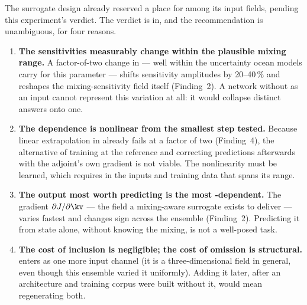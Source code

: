 The surrogate design already reserved a place for \kv{} among its input
fields, pending this experiment's verdict. The verdict is in, and the
recommendation is unambiguous, for four reasons.

\begin{enumerate}[nosep,leftmargin=1.6em]
  \item \textbf{The sensitivities measurably change within the plausible
        mixing range.} A factor-of-two change in \kv{} --- well within the
        uncertainty ocean models carry for this parameter --- shifts
        sensitivity amplitudes by 20--40\,\% and reshapes the
        mixing-sensitivity field itself (Finding~2). A network without \kv{}
        as an input cannot represent this variation at all: it would collapse
        distinct answers onto one.
  \item \textbf{The dependence is nonlinear from the smallest step tested.}
        Because linear extrapolation in \kv{} already fails at a factor of two
        (Finding~4), the alternative of training at the reference and
        correcting predictions afterwards with the adjoint's own gradient is
        not viable. The nonlinearity must be learned, which requires \kv{}
        in the inputs and training data that spans its range.
  \item \textbf{The output most worth predicting is the most
        \kv-dependent.} The gradient $\partial J/\partial\kv$ --- the field a
        mixing-aware surrogate exists to deliver --- varies fastest and
        changes sign across the ensemble (Finding~2). Predicting it from
        state alone, without knowing the mixing, is not a well-posed task.
  \item \textbf{The cost of inclusion is negligible; the cost of omission is
        structural.} \kv{} enters as one more input channel (it is a
        three-dimensional field in general, even though this ensemble varied
        it uniformly). Adding it later, after an architecture and training
        corpus were built without it, would mean regenerating both.
\end{enumerate}

